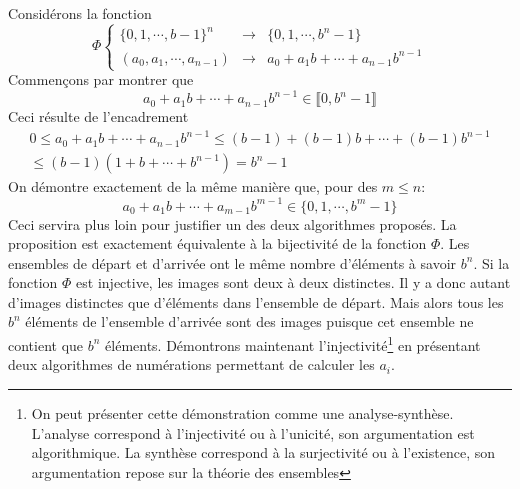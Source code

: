 Considérons la fonction
\begin{displaymath}
 \Phi\left\lbrace 
\begin{aligned}
\{0,1,\cdots,b-1\}^n &\rightarrow& \{0,1,\cdots,b^n-1\}\\
(a_0,a_1,\cdots,a_{n-1}) &\rightarrow& a_0 + a_1 b +\cdots +a_{n-1}b^{n-1} 
\end{aligned}
\right.
\end{displaymath}
Commençons par montrer que
\begin{displaymath}
 a_0 + a_1 b +\cdots +a_{n-1}b^{n-1}\in \llbracket 0,b^n-1\rrbracket
\end{displaymath}
Ceci résulte de l'encadrement
\begin{multline*}
 0\leq a_0 + a_1 b +\cdots +a_{n-1}b^{n-1} 
\leq (b-1) + (b-1) b +\cdots +(b-1)b^{n-1}\\
\leq (b-1)(1+b+\cdots +b^{n-1})=b^n-1
\end{multline*}
On démontre exactement de la même manière que, pour des $m\leq n$:
\begin{displaymath}
 a_0 + a_1 b +\cdots +a_{m-1}b^{m-1}\in \{0,1,\cdots,b^m-1\}
\end{displaymath}
Ceci servira plus loin pour justifier un des deux algorithmes proposés.\newline
La proposition est exactement équivalente à la bijectivité de la fonction $\Phi$. Les ensembles de départ et d'arrivée ont le même nombre d'éléments à savoir $b^n$.\newline
Si la fonction $\Phi$ est injective, les images sont deux à deux distinctes. Il y a donc autant d'images distinctes que d'éléments dans l'ensemble de départ. Mais alors tous les $b^n$ éléments de l'ensemble d'arrivée sont des images puisque cet ensemble ne contient que $b^n$ éléments.\newline
Démontrons maintenant l'injectivité\footnote{On peut présenter cette démonstration comme une analyse-synthèse. L'analyse correspond à l'injectivité ou à l'unicité, son argumentation est algorithmique. La synthèse correspond à la surjectivité ou à l'existence, son argumentation repose sur la théorie des ensembles} en présentant deux algorithmes de numérations permettant de calculer les $a_i$. 

